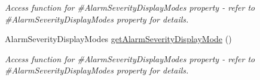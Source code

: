\begin{DoxyCompactItemize}
\begin{DoxyCompactList}\small\item\em Access function for \#AlarmSeverityDisplayModes property -\/ refer to \#AlarmSeverityDisplayModes property for details. \end{DoxyCompactList}\item 
\hypertarget{classQEAnalogProgressBar_a11ed2ae4528c7f294acdb5090955920a}{
AlarmSeverityDisplayModes \hyperlink{classQEAnalogProgressBar_a11ed2ae4528c7f294acdb5090955920a}{getAlarmSeverityDisplayMode} ()}
\label{classQEAnalogProgressBar_a11ed2ae4528c7f294acdb5090955920a}

\begin{DoxyCompactList}\small\item\em Access function for \#AlarmSeverityDisplayModes property -\/ refer to \#AlarmSeverityDisplayModes property for details. \end{DoxyCompactList}\end{DoxyCompactItemize}
